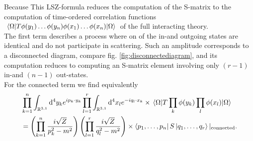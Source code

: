 Because 
This LSZ-formula reduces the computation of the S-matrix to the computation of time-ordered correlation functions\\ $\expval{T\phi(y_1) \dots \phi(y_n) \phi(x_1)\dots \phi(x_n)}{\Omega}$ of the full interacting theory.\\
The first term describes a process where on of the in-and outgoing states are identical and do not participate in scattering.
Such an amplitude corresponds to a disconnected diagram, compare fig. \ref{fig:disconnectediagram}, and its computation reduces to computing an S-matrix element involving only $(r-1)$ in-and $(n-1)$ out-states.\\
For the connected term we find equivalently
\begin{align*}
	&\prod_{k=1}^{n} \int_{\mathbb{R}^{3,1}} \mathrm{d}^4y_k e^{i p_k \cdot y_k} \prod_{l=1}^{r} \int_{\mathbb{R}^{3,1}} \mathrm{d}^4x_l e^{-i q_l \cdot x_k}  \times \expval{T\prod_k \phi(y_k) \prod_l \phi(x_l)}{\Omega}\\
	&= \left(\prod_{k=1}^n \frac{i \sqrt{Z}}{p^2_k-m^2}\right) \left(\prod_{l=1}^{r} \frac{i \sqrt{Z}}{q^2_l - m^2}\right) \times \bra{p_1,\dots,p_n}S\ket{q_1,\dots,q_r}  |_{\mathrm{connected}}.
\end{align*}
